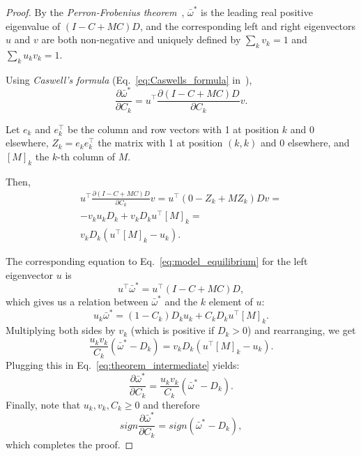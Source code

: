 \documentclass[9pt, a4paper, twocolumn]{extarticle}
\newcommand*{\tr}{^\intercal}
\begin{document}
\begin{proof}
By the \emph{Perron-Frobenius theorem}~\cite[Appendix~A]{Otto2007},
$\bar{\omega}^*$ is the leading real positive eigenvalue of $(I-C+MC)D$,
and the corresponding left and right eigenvectors $u$ and $v$ are both non-negative and uniquely defined by $\sum_k{v_k} = 1$ and $\sum_k{u_k v_k} = 1$.

Using \emph{Caswell's formula} (Eq.~\ref{eq:Caswells_formula} in~),
\begin{equation}
\frac{\partial \bar{\omega}^*}{\partial C_k} = 
u\tr \frac{\partial (I-C+MC)D}{\partial C_k} v.
\end{equation}

Let $e_k$ and $e\tr_k$ be the column and row vectors with 1 at position $k$ and 0 elsewhere, $Z_k = e_k e\tr_k$ the matrix with 1 at position $(k,k)$ and 0 elsewhere, and $[M]_k$ the $k$-th column of $M$.

Then,
\begin{equation}\label{eq:theorem_intermediate}
\begin{aligned}
u\tr \frac{\partial (I-C+MC)D}{\partial C_k} v = 
u\tr (0 - Z_k + M Z_k)D v = \\
-v_k u_k D_k + v_k D_k u\tr[M]_k = \\
v_k D_k (u\tr[M]_k - u_k). 
\end{aligned}
\end{equation}

The corresponding equation to Eq.~\ref{eq:model_equilibrium} for the left
eigenvector $u$ is 
\begin{equation}
u\tr \bar{\omega}^* = u\tr (I - C + MC) D,
\end{equation}
which gives us a relation between $\bar{\omega}^*$ and the $k$
element of $u$:
\begin{equation}
u_k \bar{\omega}^* = (1-C_k) D_k u_k + C_k D_k u\tr [M]_k.
\end{equation}
Multiplying both sides by $v_k$ (which is positive if $D_k>0$) and rearranging, we get 
\begin{equation}
\frac{u_k v_k}{C_k} (\bar{\omega}^* - D_k) = v_k D_k(u\tr [M]_k - u_k).
\end{equation}
Plugging this in Eq.~\ref{eq:theorem_intermediate} yields:
\begin{equation}
\frac{\partial \bar{\omega}^*}{\partial C_k} = 
\frac{u_k v_k}{C_k} (\bar{\omega}^* - D_k).
\end{equation}
Finally, note that $u_k, v_k, C_k \ge 0$ and therefore
\begin{equation}
sign \frac{\partial \bar{\omega}^*}{\partial C_k} = 
sign (\bar{\omega}^* - D_k),
\end{equation}
which completes the proof.
\end{proof}
\end{document}

